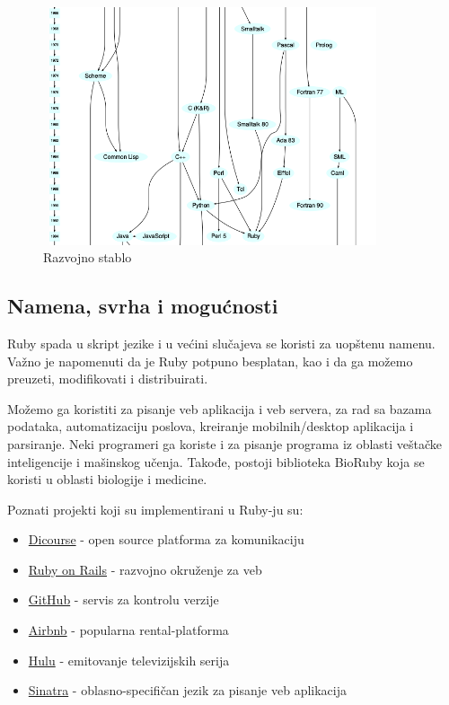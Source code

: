 \documentclass[a4paper]{article}
\begin{document}
\begin{figure}[ht!]
\begin{center}
\includegraphics[height=7cm, width=10cm]{SkracenoStablo.png}
\end{center}
\caption{Razvojno stablo}
\label{fig:sajt2}
\end{figure}

\subsection{Namena, svrha i mogućnosti}
Ruby spada u skript jezike i u većini slučajeva se koristi za uopštenu namenu. Važno je napomenuti da je Ruby potpuno besplatan, kao i da ga možemo preuzeti, modifikovati i distribuirati.

Možemo ga koristiti za pisanje veb aplikacija i veb servera, za rad sa bazama podataka, automatizaciju poslova, kreiranje mobilnih/desktop aplikacija i parsiranje. Neki programeri ga koriste i za pisanje programa iz oblasti veštačke inteligencije i mašinskog učenja. Takođe, postoji biblioteka BioRuby koja se koristi u oblasti biologije i medicine.

Poznati projekti koji su implementirani u Ruby-ju su:
\begin{itemize}
	\item \href{https://www.discourse.org/}{Dicourse} - open source platforma za komunikaciju
	\item \href{https://rubyonrails.org/}{Ruby on Rails} - razvojno okruženje za veb
	\item \href{https://www.github.com/}{GitHub} - servis za kontrolu verzije
	\item \href{https://www.airbnb.com/}{Airbnb} - popularna rental-platforma
	\item \href{https://www.hulu.com/tv}{Hulu} - emitovanje televizijskih serija
	\item \href{http://sinatrarb.com/}{Sinatra} - oblasno-specifičan jezik za pisanje veb aplikacija
\end{itemize}
\end{document}
